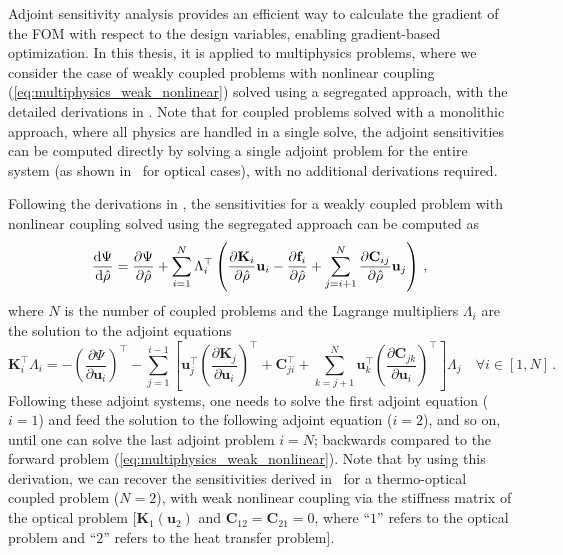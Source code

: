     Adjoint sensitivity analysis provides an efficient way to calculate the gradient of the FOM with respect to the design variables,
 enabling gradient-based optimization. In this thesis, it is applied to multiphysics problems,
 where we consider the case of weakly coupled problems with
 nonlinear coupling (\eqref{eq:multiphysics_weak_nonlinear}) solved using a segregated approach, with the detailed derivations in 
    . Note that for coupled problems solved with a monolithic approach, where all physics are handled
 in a single solve, the adjoint sensitivities can be computed directly by solving a single adjoint problem for the entire
 system (as shown in~\cite{jensen_review} for optical cases), with no additional derivations required.

 Following the derivations in , the sensitivities for a weakly coupled problem with nonlinear coupling solved using the segregated
 approach can be computed as
    \begin{equation}
 \frac{\mathop{}\!\text{d} \Psi}{\mathop{}\!\text{d} \hat{\rho}}  = \frac{\partial \Psi}{\partial \hat{\rho}} + \sum^N_{i=1} \Lambda_{i}^{\top} \left( \frac{\partial \mathbf{K}_i}{\partial \hat{\rho}} \mathbf{u}_i - \frac{\partial \mathbf{f}_i}{\partial \hat{\rho}} + \sum^N_{j=i+1} \frac{\partial \mathbf{C}_{ij}}{\partial \hat{\rho}} \mathbf{u}_j \right)\,,
    \end{equation}
 where $N$ is the number of coupled problems and the Lagrange multipliers $\Lambda_i$ are the solution to the adjoint equations
    \begin{equation}\label{eq:adjoint_eqs}
      \mathbf{K}^\top_i \Lambda_i = -\left(\frac{\partial \Psi}{\partial \mathbf{u}_i}\right)^\top - \sum_{j=1}^{i-1} \left[ 
         \mathbf{u}^\top_j \left(\frac{\partial \mathbf{K}_j}{\partial \mathbf{u}_i}\right)^\top + \mathbf{C}^\top_{ji} + \sum^N_{k=j+1} \mathbf{u}^\top_k \left(\frac{\partial \mathbf{C}_{jk}}{\partial \mathbf{u}_i}\right)^\top \right]\Lambda_j  \quad \forall i \in [1, N] \,.
   \end{equation}
 Following these adjoint systems, one needs to solve the first adjoint equation ($i=1$) 
 and feed the solution to the following adjoint equation ($i=2$), and so on, until one can solve the last adjoint problem $i=N$; backwards compared to the forward problem (\eqref{eq:multiphysics_weak_nonlinear}).
 Note that by using this derivation, we can recover the sensitivities derived in~\cite{ownpub0} for a thermo-optical coupled problem ($N=2$), with weak nonlinear coupling
 via the stiffness matrix of the optical problem [$\mathbf{K}_1(\mathbf{u}_2)$ and $\mathbf{C}_{12}=\mathbf{C}_{21}=0$, where ``$1$'' refers to the optical problem and ``$2$'' refers to the 
 heat transfer problem].
    
